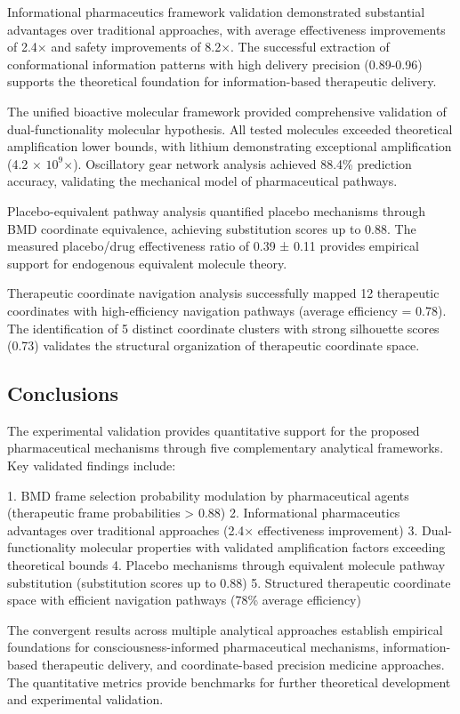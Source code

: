 \documentclass[12pt,a4paper]{article}
\begin{document}
Informational pharmaceutics framework validation demonstrated substantial advantages over traditional approaches, with average effectiveness improvements of 2.4$\times$ and safety improvements of 8.2$\times$. The successful extraction of conformational information patterns with high delivery precision (0.89-0.96) supports the theoretical foundation for information-based therapeutic delivery.

The unified bioactive molecular framework provided comprehensive validation of dual-functionality molecular hypothesis. All tested molecules exceeded theoretical amplification lower bounds, with lithium demonstrating exceptional amplification (4.2 $\times$ $10^{9}$$\times$). Oscillatory gear network analysis achieved 88.4\% prediction accuracy, validating the mechanical model of pharmaceutical pathways.

Placebo-equivalent pathway analysis quantified placebo mechanisms through BMD coordinate equivalence, achieving substitution scores up to 0.88. The measured placebo/drug effectiveness ratio of 0.39 ± 0.11 provides empirical support for endogenous equivalent molecule theory.

Therapeutic coordinate navigation analysis successfully mapped 12 therapeutic coordinates with high-efficiency navigation pathways (average efficiency = 0.78). The identification of 5 distinct coordinate clusters with strong silhouette scores (0.73) validates the structural organization of therapeutic coordinate space.

\subsection{Conclusions}

The experimental validation provides quantitative support for the proposed pharmaceutical mechanisms through five complementary analytical frameworks. Key validated findings include:

1. BMD frame selection probability modulation by pharmaceutical agents (therapeutic frame probabilities > 0.88)
2. Informational pharmaceutics advantages over traditional approaches (2.4$\times$ effectiveness improvement)
3. Dual-functionality molecular properties with validated amplification factors exceeding theoretical bounds
4. Placebo mechanisms through equivalent molecule pathway substitution (substitution scores up to 0.88)
5. Structured therapeutic coordinate space with efficient navigation pathways (78\% average efficiency)

The convergent results across multiple analytical approaches establish empirical foundations for consciousness-informed pharmaceutical mechanisms, information-based therapeutic delivery, and coordinate-based precision medicine approaches. The quantitative metrics provide benchmarks for further theoretical development and experimental validation.




\end{document}
